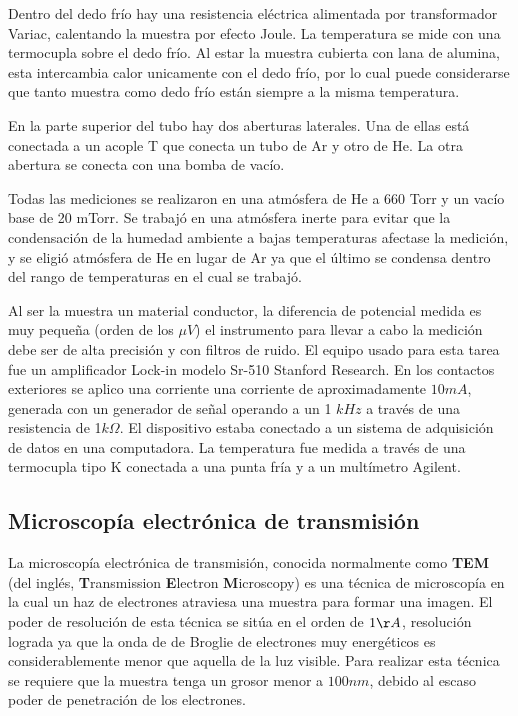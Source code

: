 \documentclass{article}
\theoremstyle{definition}
\theoremstyle{remark}
\begin{document}
Dentro del dedo frío hay una resistencia eléctrica alimentada por transformador Variac, calentando la muestra por efecto Joule. La temperatura se mide con una termocupla sobre el dedo frío. Al estar la muestra cubierta con lana de alumina, esta intercambia calor unicamente con el dedo frío, por lo cual puede considerarse que tanto muestra como dedo frío están siempre a la misma temperatura.

En la parte superior del tubo hay dos aberturas laterales. Una de ellas está conectada a un acople T que conecta un tubo de Ar y otro de He. La otra abertura se conecta con una bomba de vacío.

Todas las mediciones se realizaron en una atmósfera de He a 660 Torr y un vacío base de 20 mTorr. Se trabajó en una atmósfera inerte para evitar que la condensación de la humedad ambiente a bajas temperaturas afectase la medición, y se eligió atmósfera de He en lugar de Ar ya que el último se condensa dentro del rango de temperaturas en el cual se trabajó.

Al ser la muestra un material conductor, la diferencia de potencial medida es muy pequeña (orden de los $\mu V$) el instrumento para llevar a cabo la medición debe ser de alta precisión y con filtros de ruido. El equipo usado para esta tarea fue un amplificador Lock-in modelo Sr-510 Stanford Research. En los contactos exteriores se aplico una corriente una corriente de aproximadamente $10mA$, generada con un generador de señal operando a un 1 $kHz$ a través de una resistencia de 1$k\Omega$. El dispositivo estaba conectado a un sistema de adquisición de datos en una computadora. La temperatura fue medida a través de una termocupla tipo K conectada a una punta fría y a un multímetro Agilent.


\subsection{Microscopía electrónica de transmisión}
La microscopía electrónica de transmisión, conocida normalmente como \textbf{TEM} (del inglés, \textbf{T}ransmission \textbf{E}lectron \textbf{M}icroscopy) es una técnica de microscopía en la cual un haz de electrones atraviesa una muestra para formar una imagen. El poder de resolución de esta técnica se sitúa en el orden de $1 \AA$, resolución lograda ya que la onda de de Broglie de electrones muy energéticos es considerablemente menor que aquella de la luz visible. Para realizar esta técnica se requiere que la muestra tenga un grosor menor a $100 nm$, debido al escaso poder de penetración de los electrones.
\end{document}
